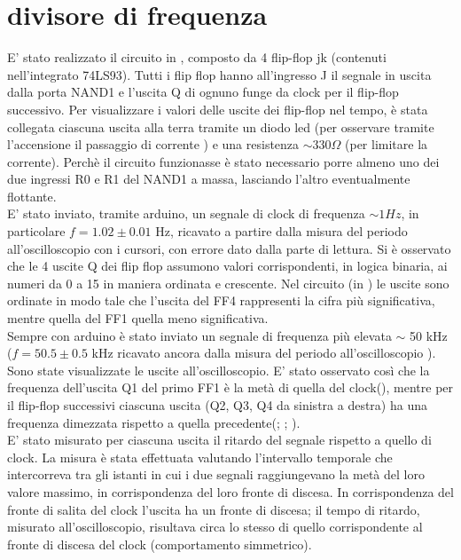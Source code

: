 \section{divisore di frequenza}
E' stato realizzato il circuito in , composto da 4 flip-flop jk (contenuti nell'integrato 74LS93). Tutti i flip flop hanno all'ingresso J il segnale in uscita dalla porta NAND1 e l'uscita Q di ognuno funge da clock per il flip-flop successivo.
Per visualizzare i valori delle uscite dei flip-flop nel tempo, è stata collegata ciascuna uscita alla terra tramite un diodo led (per osservare tramite l'accensione il passaggio di corrente ) e una resistenza $\sim 330 \Omega$ (per limitare la corrente). Perchè il circuito funzionasse è stato necessario porre almeno uno dei due ingressi R0 e R1 del NAND1 a massa, lasciando l'altro eventualmente flottante.\\
E' stato inviato, tramite arduino, un segnale di clock di frequenza $\sim 1 Hz$, in particolare $f = 1.02 \pm 0.01$ Hz, ricavato a partire dalla misura del periodo all'oscilloscopio con i cursori, con errore dato dalla parte di lettura. Si è osservato che le 4 uscite Q dei flip flop assumono valori corrispondenti, in logica binaria, ai numeri da 0 a 15 in maniera ordinata e crescente. Nel circuito (in  ) le uscite sono ordinate in modo tale che l'uscita del FF4 rappresenti la cifra più significativa, mentre  quella del FF1 quella meno significativa.\\
Sempre con arduino è stato inviato un segnale di frequenza più elevata $\sim$ 50 kHz ($f = 50.5 \pm 0.5$ kHz ricavato ancora dalla misura del periodo all'oscilloscopio ). Sono state visualizzate le uscite all'oscilloscopio. E' stato osservato così che la frequenza dell'uscita Q1 del primo FF1 è la metà di quella del clock(), mentre per il flip-flop successivi ciascuna uscita (Q2, Q3, Q4 da sinistra a destra) ha una frequenza dimezzata rispetto a quella precedente(; ; ).\\
E' stato misurato per ciascuna uscita il ritardo del segnale rispetto a quello di clock. La misura è stata effettuata valutando l'intervallo temporale che intercorreva tra gli istanti in cui i due segnali raggiungevano la metà del loro valore massimo, in corrispondenza del loro fronte di discesa. In corrispondenza del fronte di salita del clock l'uscita ha un fronte di discesa; il tempo di ritardo, misurato all'oscilloscopio, risultava circa lo stesso di quello corrispondente al fronte di discesa del clock (comportamento simmetrico).\\

